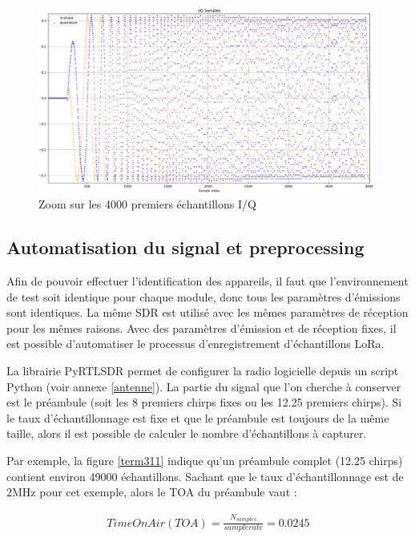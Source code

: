 \newpage

\begin{figure}[h]
\centering

\includegraphics[scale=0.13]{images/iq2.png}
\caption{Zoom sur les 4000 premiers échantillons I/Q}\label{term310}
\end{figure}

\subsection{Automatisation du signal et preprocessing}

Afin de pouvoir effectuer l'identification des appareils, il faut que l'environnement de test soit identique pour chaque module, donc tous les paramètres d'émissions sont identiques. La même \ac{SDR} est utilisé avec les mêmes paramètres de réception pour les mêmes raisons. Avec des paramètres d'émission et de réception fixes, il est possible d'automatiser le processus d'enregistrement d'échantillons \ac{LoRa}.

La librairie PyRTLSDR permet de configurer la radio logicielle depuis un script Python (voir annexe \ref{antenne}). La partie du signal que l'on cherche à conserver est le préambule (soit les 8 premiers chirps fixes ou les 12.25 premiers chirps). Si le taux d'échantillonnage est fixe et que le préambule est toujours de la même taille, alors il est possible de calculer le nombre d'échantillons à capturer. 

Par exemple, la figure \ref{term311} indique qu'un préambule complet (12.25 chirps) contient environ 49000 échantillons. Sachant que le taux d'échantillonnage est de 2MHz pour cet exemple, alors le \ac{TOA} du préambule vaut :

\begin{align}\label{toa}
    Time On Air (TOA) = \frac{N_{samples}}{sample rate} = 0.0245
\end{align}

